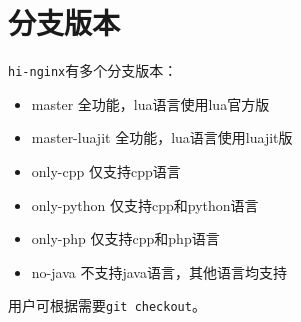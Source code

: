 \section{分支版本}
\texttt{hi-nginx}有多个分支版本：
\begin{itemize}
\item master 全功能，lua语言使用lua官方版
\item master-luajit 全功能，lua语言使用luajit版
\item only-cpp 仅支持cpp语言
\item only-python 仅支持cpp和python语言
\item only-php 仅支持cpp和php语言
\item no-java 不支持java语言，其他语言均支持
\end{itemize}
用户可根据需要\texttt{git checkout}。

